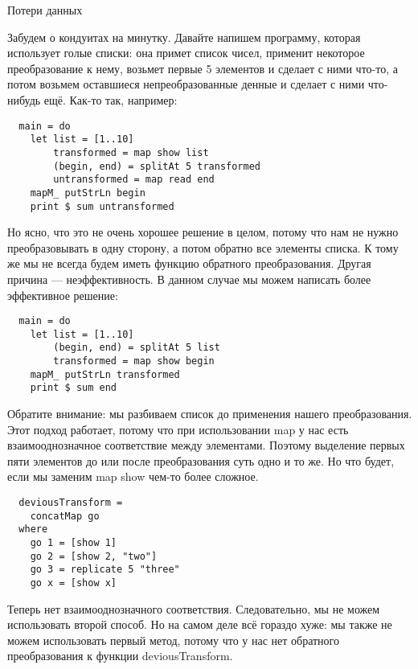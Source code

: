 Потери данных
 
Забудем о кондуитах на минутку. Давайте напишем программу, которая использует голые списки: она примет список чисел, применит некоторое преобразование к нему, возьмет первые 5 элементов и сделает с ними что-то, а потом возьмем оставшиеся непреобразованные денные и сделает с ними что-нибудь ещё. Как-то так, например:
\begin{lstlisting}
  main = do
    let list = [1..10]
        transformed = map show list
        (begin, end) = splitAt 5 transformed
        untransformed = map read end
    mapM_ putStrLn begin
    print $ sum untransformed
\end{lstlisting}
Но ясно, что это не очень хорошее решение в целом, потому что нам не нужно преобразовывать в одну сторону, а потом обратно все элементы списка. К тому же мы не всегда будем иметь функцию обратного преобразования. Другая причина --- неэффективность. В данном случае мы можем написать более эффективное решение:
\begin{lstlisting}
  main = do
    let list = [1..10]
        (begin, end) = splitAt 5 list
        transformed = map show begin
    mapM_ putStrLn transformed
    print $ sum end
\end{lstlisting}
Обратите внимание: мы разбиваем список до применения  нашего преобразования. Этот подход работает, потому что при использовании map у нас есть взаимооднозначное соответствие между элементами. Поэтому выделение первых пяти элементов до или после преобразования суть одно и то же. Но что будет, если мы заменим map show чем-то более сложное.
\begin{lstlisting}
  deviousTransform =
    concatMap go
  where
    go 1 = [show 1]
    go 2 = [show 2, "two"]
    go 3 = replicate 5 "three"
    go x = [show x]
\end{lstlisting}
Теперь нет взаимооднозначного соответствия. Следовательно, мы не можем использовать второй способ. Но на самом деле всё гораздо хуже: мы также не можем использовать первый метод, потому что у нас нет обратного преобразования к функции deviousTransform.
 
